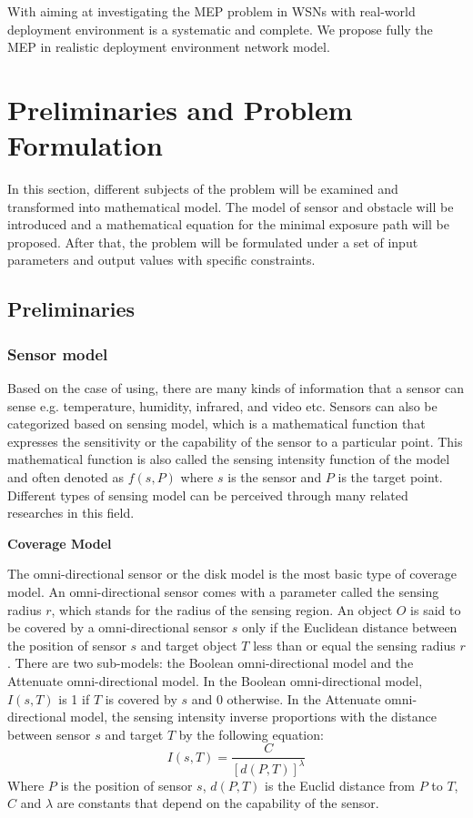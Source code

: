 \documentclass[final]{elsarticle}
\begin{document}
With aiming at investigating the MEP problem in WSNs with real-world deployment environment is a systematic and complete. We propose fully the MEP in realistic deployment environment network model. 
\section{Preliminaries and Problem Formulation}
In this section, different subjects of the problem will be examined and transformed into mathematical model. The model of sensor and obstacle will be introduced and a mathematical equation for the minimal exposure path will be proposed. After that, the problem will be formulated under a set of input parameters and output values with specific constraints.
\subsection{Preliminaries}
\subsubsection{Sensor model}
Based on the case of using, there are many kinds of information that a sensor can sense e.g. temperature, humidity, infrared, and video etc. Sensors can also be categorized based on sensing model, which is a mathematical function that expresses the sensitivity or the capability of the sensor to a particular point. This mathematical function is also called the sensing intensity function of the model and often denoted as $f(s, P)$ where $ s $ is the sensor and $ P $ is the target point. Different types of sensing model can be perceived through many related researches in this field.

\textbf{Coverage Model}

The omni-directional sensor or the disk model is the most basic type of coverage model. An omni-directional sensor comes with a parameter called the sensing radius $r$, which stands for the radius of the sensing region. An object $ O $ is said to be covered by a omni-directional sensor $ s $ only if the Euclidean distance between the position of sensor $ s $ and target object $ T $ less than or equal the sensing radius $r$. There are two sub-models: the Boolean omni-directional model and the Attenuate omni-directional model. In the Boolean omni-directional model, $I(s, T)$ is 1 if $ T $ is covered by $ s $ and 0 otherwise. In the Attenuate omni-directional model, the sensing intensity inverse proportions with the distance between sensor $ s $ and target $ T $ by the following equation:
\begin{equation}
\label{eqfo}
I({s},T) = \frac{C}{{{{\left[ {d(P,T)} \right]}^\lambda }}}
\end{equation}
Where $ P $ is the position of sensor $ s $, $ d(P,T) $ is the Euclid distance from $ P $ to $ T $, $ C $ and $ \lambda $ are constants that depend on the capability of the sensor. 
\end{document}
